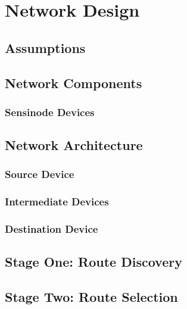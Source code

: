 \chapter{Network Design}
\label{chap:design}

\section{Assumptions}

\section{Network Components}

\subsection{Sensinode Devices}


\section{Network Architecture}

\subsection{Source Device}
\subsection{Intermediate Devices}
\subsection{Destination Device}


\section{Stage One: Route Discovery}

\section{Stage Two: Route Selection}







